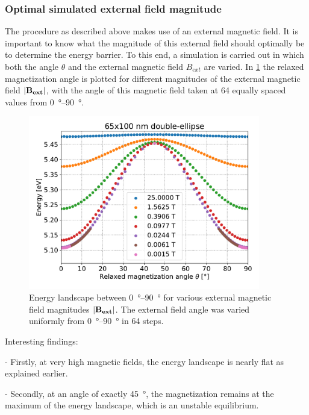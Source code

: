 \documentclass[10pt,a4paper]{article}
\begin{document}
\subsubsection{Optimal simulated external field magnitude}
The procedure as described above makes use of an external magnetic field. It is important to know what the magnitude of this external field should optimally be to determine the energy barrier. To this end, a simulation is carried out in which both the angle $\theta$ and the external magnetic field $B_{ext}$ are varied. In \cref{fig:barrierLandscape-sweepBext} the relaxed magnetization angle is plotted for different magnitudes of the external magnetic field $\abs{\vb{B_{ext}}}$, with the angle of this magnetic field taken at 64 equally spaced values from \SIrange{0}{90}{\degree}.
\begin{figure}
    \centering
    \includegraphics[width=0.9\textwidth]{Figures/biaxial_island/BarrierLandscape/Plus_65_B25-0.001-div4_a128Pi_plotOptimized.pdf}
    \caption{Energy landscape between \SIrange{0}{90}{\degree} for various external magnetic field magnitudes $\abs{\vb{B_{ext}}}$. The external field angle was varied uniformly from \SIrange{0}{90}{\degree} in 64 steps.}
    \label{fig:barrierLandscape-sweepBext}
\end{figure}

Interesting findings:

- Firstly, at very high magnetic fields, the energy landscape is nearly flat as explained earlier.~\cite{Nonmonotonic_reversal}

- Secondly, at an angle of exactly \SI{45}{\degree}, the magnetization remains at the maximum of the energy landscape, which is an unstable equilibrium.
\end{document}
